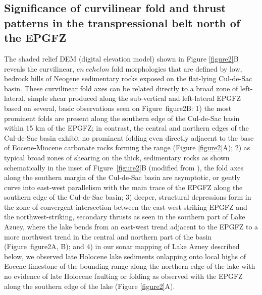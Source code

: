 \documentclass[linenumbers,draft]{agujournal}
\begin{document}
\subsection{Significance of curvilinear fold and thrust patterns in the transpressional belt north of the EPGFZ}
The shaded relief DEM (digital elevation model) shown in Figure \ref{figure2}B reveals the curvilinear, $en~echelon$ fold morphologies that are defined by low, bedrock hills of Neogene sedimentary rocks exposed on the flat-lying Cul-de-Sac basin. These curvilinear fold axes can be related directly to a broad zone of left-lateral, simple shear produced along the sub-vertical and left-lateral EPGFZ based on several, basic observations seen on Figure~{figure2}B: 1) the most prominent folds are present along the southern edge of the Cul-de-Sac basin within 15 km of the EPGFZ; in contrast, the central and northern edges of the Cul-de-Sac basin exhibit no prominent folding even directly adjacent to the base of Eocene-Miocene carbonate rocks forming the range \citep{pubellier2000plate} (Figure \ref{figure2}A); 2) as typical broad zones of shearing on the thick, sedimentary rocks as shown schematically in the inset of Figure~\ref{figure2}B (modified from \citet{odonne1983analogue}), the fold axes along the southern margin of the Cul-de-Sac basin are asymptotic, or gently curve into east-west parallelism with the main trace of the EPGFZ along the southern edge of the Cul-de-Sac basin; 3) deeper, structural depressions form in the zone of convergent intersection between the east-west-striking EPGFZ and the northwest-striking, secondary thrusts as seen in the southern part of Lake Azuey, where the lake bends from an east-west trend adjacent to the EPGFZ to a more northwest trend in the central and northern part of the basin (Figure~{figure2}A, B); and 4) in our sonar mapping of Lake Azuey described below, we observed late Holocene lake sediments onlapping onto local highs of Eocene limestone of the bounding range along the northern edge of the lake with no evidence of late Holocene faulting or folding as observed with the EPGFZ along the southern edge of the lake (Figure \ref{figure2}A). 
\end{document}
